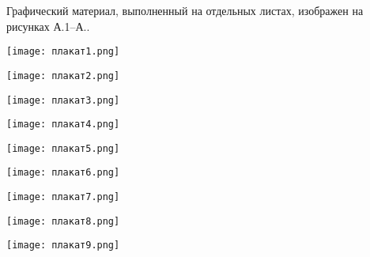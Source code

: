 
Графический материал, выполненный на отдельных листах,
изображен на рисунках А.1--А..
\setcounter{числоПлакатов}{0}

\renewcommand{\thefigure}{А.\arabic{figure}} %

\begin{landscape}

\begin{плакат}
    \texttt{[image: плакат1.png]}
    \label{pl1:image}      
\end{плакат}

\begin{плакат}
    \texttt{[image: плакат2.png]}
    \label{pl2:image}      
\end{плакат}

\begin{плакат}
    \texttt{[image: плакат3.png]}
    \label{pl3:image}      
\end{плакат}

\begin{плакат}
    \texttt{[image: плакат4.png]}
    \label{pl4:image}      
\end{плакат}

\begin{плакат}
    \texttt{[image: плакат5.png]}
    \label{pl5:image}
\end{плакат}

\begin{плакат}
    \texttt{[image: плакат6.png]}
    \label{pl6:image}
\end{плакат}

\begin{плакат}
    \texttt{[image: плакат7.png]}
    \label{pl7:image}
\end{плакат}

\begin{плакат}
    \texttt{[image: плакат8.png]}
    \label{pl8:image}
\end{плакат}

\begin{плакат}
    \texttt{[image: плакат9.png]}
    \label{pl9:image}
\end{плакат}

\end{landscape}
